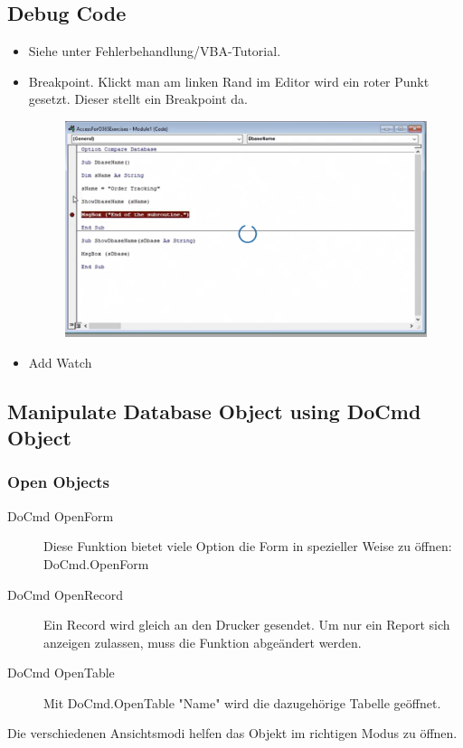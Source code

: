 \subsection{Debug Code}
\begin{itemize}
\item Siehe unter Fehlerbehandlung/VBA-Tutorial. 
\item Breakpoint. Klickt man am linken Rand im Editor wird ein roter Punkt gesetzt. Dieser stellt ein Breakpoint da. 
\begin{figure}[H]
	\centering
	\includegraphics[scale = 0.3]{attachment/chapter_2/Scc061}
	\caption{}
	\label{fig:Scc061}
\end{figure} 
\item Add Watch
\end{itemize}

\subsection{Manipulate Database Object using DoCmd Object}
\subsubsection{Open Objects} 
\begin{description}
\item[DoCmd OpenForm] Diese Funktion bietet viele Option die Form in spezieller Weise zu öffnen: DoCmd.OpenForm
\item[DoCmd OpenRecord] Ein Record wird gleich an den Drucker gesendet. Um nur ein Report sich anzeigen zulassen, muss die Funktion abgeändert werden.
\item[DoCmd OpenTable] Mit DoCmd.OpenTable "Name" wird die dazugehörige Tabelle geöffnet.
\end{description}  
 Die verschiedenen Ansichtsmodi helfen das Objekt im richtigen Modus zu öffnen.

